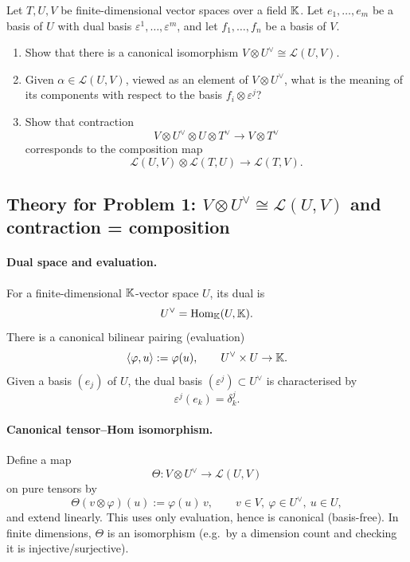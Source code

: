 \documentclass[12pt,a4paper]{article}
\theoremstyle{plain}
\theoremstyle{definition}      %
\begin{document}
	\noindent Let $T,U,V$ be finite-dimensional vector spaces over a field $\Bbb K$.
	Let $e_1,\dots,e_m$ be a basis of $U$ with dual basis $\varepsilon^1,\dots,\varepsilon^m$,
	and let $f_1,\dots,f_n$ be a basis of $V$.
	\begin{enumerate}
		\item[(a)] Show that there is a canonical isomorphism $V\otimes U^\vee \cong \mathcal L(U,V)$.
		\item[(b)] Given $\alpha\in \mathcal L(U,V)$, viewed as an element of $V\otimes U^\vee$,
		what is the meaning of its components with respect to the basis $f_i\otimes \varepsilon^j$?
		\item[(c)] Show that contraction
		\[
		V\otimes U^\vee\otimes U\otimes T^\vee \longrightarrow V\otimes T^\vee
		\]
		corresponds to the composition map
		\[
		\mathcal L(U,V)\otimes \mathcal L(T,U)\longrightarrow \mathcal L(T,V).
		\]
	\end{enumerate}
	
	
	\subsection*{Theory for Problem 1: $V\otimes U^\vee \cong \mathcal L(U,V)$ and contraction = composition}
	
	\paragraph{\textbf{Dual space and evaluation.}}
	For a finite-dimensional $\Bbb K$-vector space $U$, its dual is
	\[
	U^\vee=\mathrm{Hom}_\Bbb K(U,\Bbb K).
	\]
	There is a canonical bilinear pairing (evaluation)
	\[
	\langle \varphi,u\rangle := \varphi(u),\qquad U^\vee\times U\to \Bbb K.
	\]
	Given a basis $(e_j)$ of $U$, the dual basis $(\varepsilon^j)\subset U^\vee$ is characterised by
	\[
	\varepsilon^j(e_k)=\delta^j_k.
	\]
	
	\paragraph{\textbf{Canonical tensor--Hom isomorphism.}}
	Define a map
	\[
	\Theta: V\otimes U^\vee \longrightarrow \mathcal L(U,V)
	\]
	on pure tensors by
	\[
	\Theta(v\otimes \varphi)(u) := \varphi(u)\,v,\qquad v\in V,\ \varphi\in U^\vee,\ u\in U,
	\]
	and extend linearly. This uses only evaluation, hence is canonical (basis-free). In finite dimensions,
	$\Theta$ is an isomorphism (e.g.\ by a dimension count and checking it is injective/surjective).
	
\end{document}
